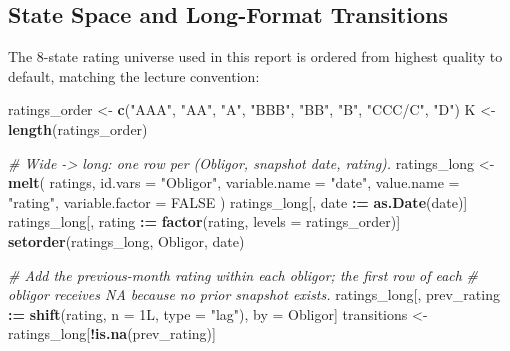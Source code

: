 \documentclass[
  11pt,
]{article}
\newenvironment{Shaded}{\begin{snugshade}}{\end{snugshade}}
\newcommand{\AttributeTok}[1]{\textcolor[rgb]{0.13,0.29,0.53}{#1}}
\newcommand{\CommentTok}[1]{\textcolor[rgb]{0.56,0.35,0.01}{\textit{#1}}}
\newcommand{\ConstantTok}[1]{\textcolor[rgb]{0.56,0.35,0.01}{#1}}
\newcommand{\DataTypeTok}[1]{\textcolor[rgb]{0.13,0.29,0.53}{#1}}
\newcommand{\DecValTok}[1]{\textcolor[rgb]{0.00,0.00,0.81}{#1}}
\newcommand{\FunctionTok}[1]{\textcolor[rgb]{0.13,0.29,0.53}{\textbf{#1}}}
\newcommand{\NormalTok}[1]{#1}
\newcommand{\OtherTok}[1]{\textcolor[rgb]{0.56,0.35,0.01}{#1}}
\newcommand{\SpecialCharTok}[1]{\textcolor[rgb]{0.81,0.36,0.00}{\textbf{#1}}}
\newcommand{\StringTok}[1]{\textcolor[rgb]{0.31,0.60,0.02}{#1}}
\begin{document}
\subsection{State Space and Long-Format
Transitions}\label{state-space-and-long-format-transitions}

The 8-state rating universe used in this report is ordered from highest
quality to default, matching the lecture convention:

\begin{Shaded}
\begin{Highlighting}[]
\NormalTok{ratings\_order }\OtherTok{\textless{}{-}} \FunctionTok{c}\NormalTok{(}\StringTok{"AAA"}\NormalTok{, }\StringTok{"AA"}\NormalTok{, }\StringTok{"A"}\NormalTok{, }\StringTok{"BBB"}\NormalTok{, }\StringTok{"BB"}\NormalTok{, }\StringTok{"B"}\NormalTok{, }\StringTok{"CCC/C"}\NormalTok{, }\StringTok{"D"}\NormalTok{)}
\NormalTok{K }\OtherTok{\textless{}{-}} \FunctionTok{length}\NormalTok{(ratings\_order)}

\CommentTok{\# Wide {-}\textgreater{} long: one row per (Obligor, snapshot date, rating).}
\NormalTok{ratings\_long }\OtherTok{\textless{}{-}} \FunctionTok{melt}\NormalTok{(}
\NormalTok{    ratings,}
    \AttributeTok{id.vars         =} \StringTok{"Obligor"}\NormalTok{,}
    \AttributeTok{variable.name   =} \StringTok{"date"}\NormalTok{,}
    \AttributeTok{value.name      =} \StringTok{"rating"}\NormalTok{,}
    \AttributeTok{variable.factor =} \ConstantTok{FALSE}
\NormalTok{)}
\NormalTok{ratings\_long[, date   }\SpecialCharTok{:=} \FunctionTok{as.Date}\NormalTok{(date)]}
\NormalTok{ratings\_long[, rating }\SpecialCharTok{:=} \FunctionTok{factor}\NormalTok{(rating, }\AttributeTok{levels =}\NormalTok{ ratings\_order)]}
\FunctionTok{setorder}\NormalTok{(ratings\_long, Obligor, date)}

\CommentTok{\# Add the previous{-}month rating within each obligor; the first row of each}
\CommentTok{\# obligor receives NA because no prior snapshot exists.}
\NormalTok{ratings\_long[, prev\_rating }\SpecialCharTok{:=} \FunctionTok{shift}\NormalTok{(rating, }\AttributeTok{n =} \DecValTok{1}\DataTypeTok{L}\NormalTok{, }\AttributeTok{type =} \StringTok{"lag"}\NormalTok{),}
\NormalTok{             by }\OtherTok{=}\NormalTok{ Obligor]}
\NormalTok{transitions }\OtherTok{\textless{}{-}}\NormalTok{ ratings\_long[}\SpecialCharTok{!}\FunctionTok{is.na}\NormalTok{(prev\_rating)]}
\end{Highlighting}
\end{Shaded}
\end{document}
